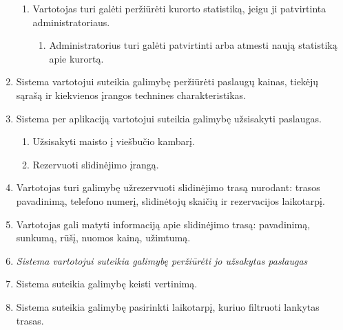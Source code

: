\documentclass[oneside]{VUMIFPSkursinis}
\begin{document}
\begin{enumerate}
\begin{enumerate}
		\item Vartotojas turi galėti peržiūrėti kurorto statistiką, jeigu ji patvirtinta administratoriaus.
		\begin{enumerate}
			\item Administratorius turi galėti patvirtinti arba atmesti naują statistiką apie kurortą.
		\end{enumerate}
	\end{enumerate}
	\item Sistema vartotojui suteikia galimybę peržiūrėti paslaugų kainas, tiekėjų sąrašą ir kiekvienos įrangos technines charakteristikas.
	\item Sistema per aplikaciją vartotojui suteikia galimybę užsisakyti paslaugas.
	\begin{enumerate}
		\item Užsisakyti maisto į viešbučio kambarį.
		\item Rezervuoti slidinėjimo įrangą.
	\end{enumerate}
	\item Vartotojas turi galimybę užrezervuoti slidinėjimo trasą nurodant: trasos pavadinimą, telefono numerį, slidinėtojų skaičių ir rezervacijos laikotarpį.
	\item Vartotojas gali matyti informaciją apie slidinėjimo trasą: pavadinimą, sunkumą, rūšį, nuomos kainą, užimtumą.
	\item \textit{Sistema vartotojui suteikia galimybę peržiūrėti jo užsakytas paslaugas}
	\item Sistema suteikia galimybę keisti vertinimą.
	\item Sistema suteikia galimybę pasirinkti laikotarpį, kuriuo filtruoti lankytas trasas.
	
\end{enumerate}
\end{document}
